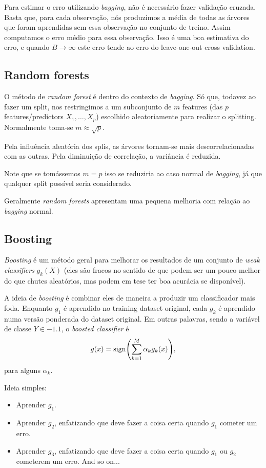 \documentclass[a4paper,fleqn,12pt]{article}
\begin{document}
Para estimar o erro utilizando \textit{bagging}, não é necessário fazer validação cruzada. Basta que, para cada observação, nós produzimos a média de todas as árvores que foram aprendidas sem essa observação no conjunto de treino. Assim computamos o erro médio para essa observação. Isso é uma boa estimativa do erro, e quando $B \to \infty$ este erro tende ao erro do leave-one-out cross validation.

\subsection{Random forests}

O método de \textit{random forest} é dentro do contexto de \textit{bagging}. Só que, todavez ao fazer um split, nos restringimos a um subconjunto de $m$ features (das $p$ features/predictors $X_1, \ldots, X_p$) escolhido aleatoriamente para realizar o splitting. Normalmente toma-se $m \approx \sqrt{p}$.

Pela influência aleatória dos splis, as árvores tornam-se mais descorrelacionadas com as outras. Pela diminuição de correlação, a variância é reduzida.

Note que se tomássemos $m = p$ isso se reduziria ao caso normal de \textit{bagging}, já que qualquer split possível seria considerado.

Geralmente \textit{random forests} apresentam uma pequena melhoria com relação ao \textit{bagging} normal.

\subsection{Boosting}

\textit{Boosting} é um método geral para melhorar os resultados de um conjunto de \textit{weak classifiers} $g_k(X)$ (eles são fracos no sentido de que podem ser um pouco melhor do que chutes aleatórios, mas podem em tese ter boa acurácia se disponível).

A ideia de \textit{boosting} é combinar eles de maneira a produzir um classificador mais foda. Enquanto $g_1$ é aprendido no training dataset original, cada $g_k$ é aprendido numa versão ponderada do dataset original. Em outras palavras, sendo a variável de classe $Y \in \qty{-1,1}$, o \textit{boosted classifier} é
$$
g(x) = \text{sign}\qty(\sum_{k=1}^{M} \alpha_k g_k(x)),
$$
para alguns $\alpha_k$.

Ideia simples:
\begin{itemize}
\item Aprender $g_1$.
\item Aprender $g_2$, enfatizando que deve fazer a coisa certa quando $g_1$ cometer um erro.
\item Aprender $g_3$, enfatizando que deve fazer a coisa certa quando $g_1$ ou $g_2$ cometerem um erro. And so on...
\end{itemize}
\end{document}

